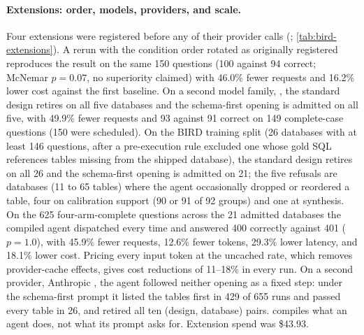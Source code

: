 \paragraph{Extensions: order, models, providers, and scale.} Four extensions
were registered before any of their provider calls
(;
\cref{tab:bird-extensions}). A rerun with the condition order rotated as
originally registered reproduces the result on the same 150 questions (100
against 94 correct; McNemar $p=0.07$, no superiority claimed) with 46.0\% fewer
requests and 16.2\% lower cost against the first baseline. On a second model
family, , the standard design retires on all five databases and
the schema-first opening is admitted on all five, with 49.9\% fewer requests and
93 against 91 correct on 149 complete-case questions (150 were scheduled). On the BIRD training split (26 databases
with at least 146 questions, after a pre-execution rule excluded one whose gold
SQL references tables missing from the shipped database), the standard design
retires on all 26 and the schema-first opening is admitted on 21; the five
refusals are databases (11 to 65 tables) where the agent occasionally dropped or
reordered a table, four on calibration support (90 or 91 of 92
groups) and one at synthesis. On the 625 four-arm-complete questions across the 21 admitted
databases the compiled agent dispatched every time and answered 400 correctly
against 401 ($p=1.0$), with 45.9\% fewer requests, 12.6\% fewer tokens, 29.3\%
lower latency, and 18.1\% lower cost. Pricing every input token at the uncached
rate, which removes provider-cache effects, gives cost reductions of 11--18\% in
every run. On a second provider, Anthropic , the agent
followed neither opening as a fixed step: under the schema-first prompt it
listed the tables first in 429 of 655 runs and passed every table in 26, and
\method retired all ten (design, database) pairs. \method compiles what an agent
does, not what its prompt asks for. Extension spend was \$43.93.

\begin{table}[t]
  \centering
  \caption{BIRD runs. ``Std.'' and ``S.-first'' count databases admitted per
  design (the rotated rerun reuses the primary artifacts). Correct is on the
  held-out questions completed by all four conditions; bold marks the compiled arm,
not a significant improvement. Reductions compare the compiled
  agent with the unchanged agent; $^\dagger$every primary-row reduction is against
  the warm repeat run because that run's order was not rotated. Cost$^\ast$ prices every input token
  at the uncached rate.}
  \label{tab:bird-extensions}
  \footnotesize
  \resizebox{\linewidth}{!}{}
\end{table}


